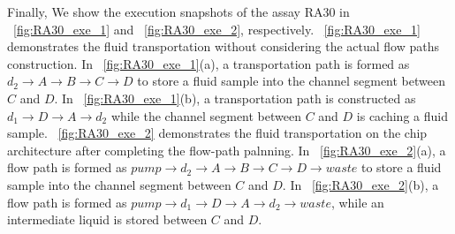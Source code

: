   Finally, We show the execution snapshots of the assay RA30
  in \figname~\ref{fig:RA30_exe_1} and \figname~\ref{fig:RA30_exe_2}, respectively.
  \figname~\ref{fig:RA30_exe_1} demonstrates the fluid transportation without considering the actual flow paths construction. In \figname~\ref{fig:RA30_exe_1}(a), a transportation path is formed as $d_2\to A\to B \to C \to D $ to store a fluid sample into the channel segment between $C$ and $D$. In \figname~\ref{fig:RA30_exe_1}(b), a transportation path is constructed as $d_1\to D \to A \to d_2$ while the channel segment between $C$ and $D$ is caching a fluid sample.
  \figname~\ref{fig:RA30_exe_2} demonstrates the fluid transportation on the chip architecture after completing the flow-path palnning. In \figname~\ref{fig:RA30_exe_2}(a), a flow path is
formed as $pump \to d_2\to A \to B \to C \to D\to waste$ to store a fluid sample
into the channel segment between $C$ and $D$. In \figname~\ref{fig:RA30_exe_2}(b), a flow path is formed as $pump
\to d_1 \to D \to A \to d_2 \to waste$, while an intermediate liquid is stored between $C$ and $D$.




